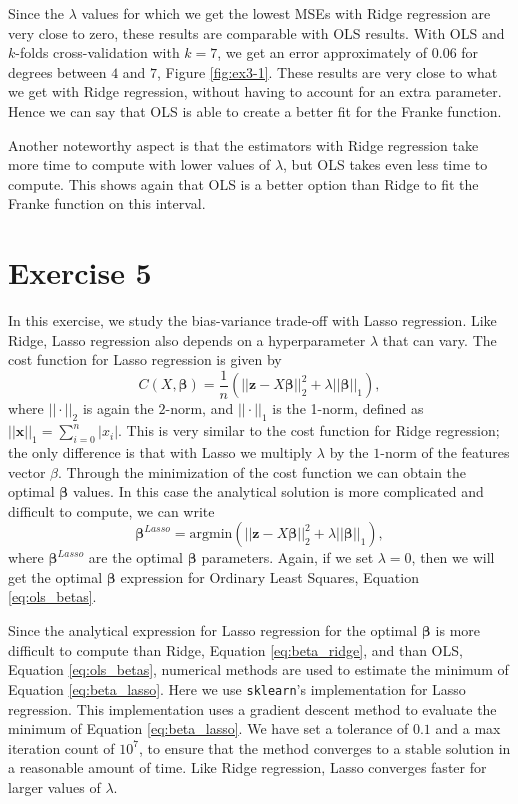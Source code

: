 \documentclass[10pt, a4paper]{article}
\begin{document}
    Since the $\lambda$ values for which we get the lowest MSEs with Ridge regression are very close to zero, these results are comparable with OLS results. With OLS and $k$-folds cross-validation with $k=7$, we get an error approximately of $0.06$ for degrees between $4$ and $7$, Figure \ref{fig:ex3-1}. These results are very close to what we get with Ridge regression, without having to account for an extra parameter. Hence we can say that OLS is able to create a better fit for the Franke function.
    
    Another noteworthy aspect is that the estimators with Ridge regression take more time to compute with lower values of $\lambda$, but OLS takes even less time to compute. This shows again that OLS is a better option than Ridge to fit the Franke function on this interval.
    
\section*{Exercise 5}
    
    In this exercise, we study the bias-variance trade-off with Lasso regression. Like Ridge, Lasso regression also depends on a hyperparameter $\lambda$ that can vary. The cost function for Lasso regression is given by
    \begin{equation*}
        C(X, \bm{\beta}) = \frac{1}{n} \left(|| \bm{z} - X\bm{\beta} ||_2^2 + \lambda || \bm{\beta} ||_1\right),
    \end{equation*}
    where $||\cdot||_2$ is again the $2$-norm, and $||\cdot||_1$ is the 1-norm, defined as $||\bm{x}||_1=\sum_{i=0}^n |x_i|$. This is very similar to the cost function for Ridge regression; the only difference is that with Lasso we multiply $\lambda$ by the $1$-norm of the features vector $\beta$. Through the minimization of the cost function we can obtain the optimal $\bm{\beta}$ values. In this case the analytical solution is more complicated and difficult to compute, we can write
    \begin{equation} \label{eq:beta_lasso}
        \bm{\beta}^{Lasso} = \text{argmin}\left( || \bm{z} - X\bm{\beta} ||_2^2 + \lambda || \bm{\beta} ||_1 \right),
    \end{equation}
    where $\bm{\beta}^{Lasso}$ are the optimal $\bm{\beta}$ parameters. Again, if we set $\lambda = 0$, then we will get the optimal $\bm{\beta}$ expression for Ordinary Least Squares, Equation \eqref{eq:ols_betas}.
    
    Since the analytical expression for Lasso regression for the optimal $\bm{\beta}$ is more difficult to compute than Ridge, Equation \eqref{eq:beta_ridge}, and than OLS, Equation \eqref{eq:ols_betas}, numerical methods are used to estimate the minimum of Equation \eqref{eq:beta_lasso}. Here we use \texttt{sklearn}'s implementation for Lasso regression. This implementation uses a gradient descent method to evaluate the minimum of Equation \eqref{eq:beta_lasso}. We have set a tolerance of $0.1$ and a max iteration count of $10^7$, to ensure that the method converges to a stable solution in a reasonable amount of time. Like Ridge regression, Lasso converges faster for larger values of $\lambda$.
    
\end{document}
